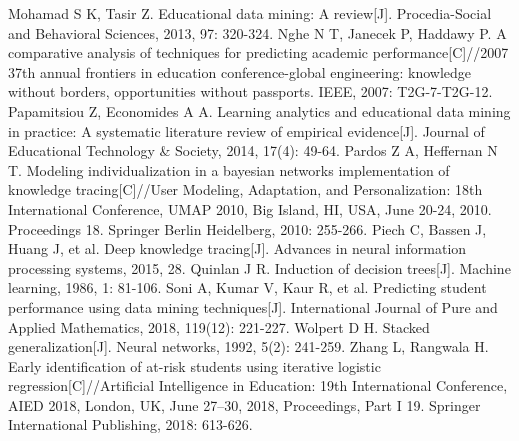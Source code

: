 \documentclass[a4paper, utf8]{ctexart}
\begin{document}
\begin{thebibliography}{99}
		 Mohamad S K, Tasir Z. Educational data mining: A review[J]. Procedia-Social and Behavioral Sciences, 2013, 97: 320-324.
		 Nghe N T, Janecek P, Haddawy P. A comparative analysis of techniques for predicting academic performance[C]//2007 37th annual frontiers in education conference-global engineering: knowledge without borders, opportunities without passports. IEEE, 2007: T2G-7-T2G-12.
		 Papamitsiou Z, Economides A A. Learning analytics and educational data mining in practice: A systematic literature review of empirical evidence[J]. Journal of Educational Technology \& Society, 2014, 17(4): 49-64.
		 Pardos Z A, Heffernan N T. Modeling individualization in a bayesian networks implementation of knowledge tracing[C]//User Modeling, Adaptation, and Personalization: 18th International Conference, UMAP 2010, Big Island, HI, USA, June 20-24, 2010. Proceedings 18. Springer Berlin Heidelberg, 2010: 255-266.
		 Piech C, Bassen J, Huang J, et al. Deep knowledge tracing[J]. Advances in neural information processing systems, 2015, 28.
		 Quinlan J R. Induction of decision trees[J]. Machine learning, 1986, 1: 81-106.
		 Soni A, Kumar V, Kaur R, et al. Predicting student performance using data mining techniques[J]. International Journal of Pure and Applied Mathematics, 2018, 119(12): 221-227.
		 Wolpert D H. Stacked generalization[J]. Neural networks, 1992, 5(2): 241-259.
		 Zhang L, Rangwala H. Early identification of at-risk students using iterative logistic regression[C]//Artificial Intelligence in Education: 19th International Conference, AIED 2018, London, UK, June 27–30, 2018, Proceedings, Part I 19. Springer International Publishing, 2018: 613-626.
	\end{thebibliography}
	
\end{document}
